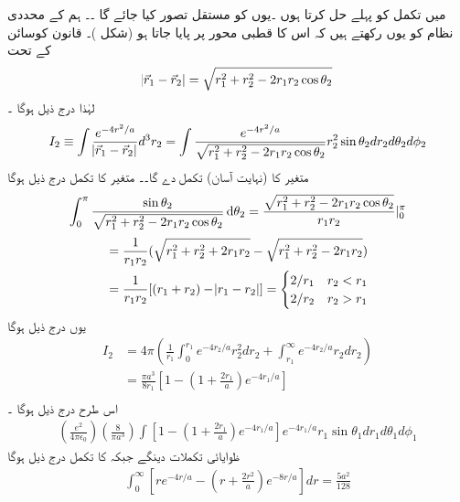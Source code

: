 میں    تکمل کو پہلے حل کرتا ہوں ۔یوں   کو مستقل تصور کیا جائے گا ۔۔
ہم   کے محددی نظام کو یوں رکھتے ہیں کہ اس کا قطبی محور   پر پایا جاتا ہو (شکل )۔
قانون کوسائن کے تحت 
\begin{align}
\abs{\vec{r}_{1}-\vec{r}_{2}}=\sqrt{r_{1}^{2}+r_{2}^{2}-2r_{1}r_{2}\cos{\theta_{2}}} 
\end{align}
 لہٰذا درج ذیل ہوگا ۔
\begin{align}
I_{2}\equiv\int\frac{e^{-4r^{2}/a}}{\abs{\vec{r}_{1}-\vec{r}_{2}}}d^{3}r_{2}=\int\frac{e^{-4r^{2}/a}}{\sqrt{r_{1}^{2}+r_{2}^{2}-2r_{1}r_{2}\cos{\theta_{2}}}}r_{2}^{2}\sin{\theta_{2}}dr_{2}d\theta_{2}d\phi_{2} 
\end{align}
 متغیر   کا (نہایت آسان) تکمل    دے گا۔۔
متغیر    کا تکمل درج ذیل ہوگا
\begin{align*} \int_{0}^{\pi}\frac{\sin{\theta_{2}}}{\sqrt{r_{1}^{2}+r_{2}^{2}-2r_{1}r_{2}\cos{\theta_{2}}}}\dif{\theta_{2}}=\frac{\sqrt{r_{1}^{2}+r_{2}^{2}-2r_{1}r_{2}\cos{\theta_{2}}}}{r_{1}r_{2}}|_{0}^{\pi} \end{align*} \begin{align*} &=\frac{1}{r_{1}r_{2}}(\sqrt{r_{1}^{2}+r_{2}^{2}+2r_{1}r_{2}}-\sqrt{r_{1}^{2}+r_{2}^{2}-2r_{1}r_{2}})\\
&=\frac{1}{r_{1}r_{2}}[(r_{1}+r_{2})-\abs{r_{1}-r_{2}}]=\begin{cases} 2/r_{1} & r_{2}<r_{1}\\
2/r_{2}&r_{2}>r_{1}\\
\end{cases}\\
\end{align*} یوں درج ذیل ہوگا 
\begin{align*} I_{2}&=4\pi(\frac{1}{r_{1}}\int_{0}^{r_{1}}e^{-4r_{2}/a}r_{2}^{2}dr_{2}+\int_{r_{1}}^{\infty}e^{-4r_{2}/a}r_{2}dr_{2})\\
&=\frac{\pi a^{3}}{8r_{1}}[1-(1+\frac{2r_{1}}{a})e^{-4r_{1}/a}]\\
\end{align*} اس طرح   درج ذیل ہوگا ۔
\begin{align}
(\frac{e^{2}}{4\pi\epsilon_{0}})(\frac{8}{\pi a^{3}})\int[1-(1+\frac{2r_{1}}{a})e^{-4r_{1}/a}]e^{-4r_{1}/a}r_{1}\sin{\theta_{1}}dr_{1}d\theta_{1}d\phi_{1} 
\end{align}
 ظوایائی تکملات   دینگے جبکہ    کا تکمل درج ذیل ہوگا
\begin{align}
\int_{0}^{\infty}[re^{-4r/a}-(r+\frac{2r^{2}}{a})e^{-8r/a}]dr=\frac{5a^{2}}{128} 
\end{align}
